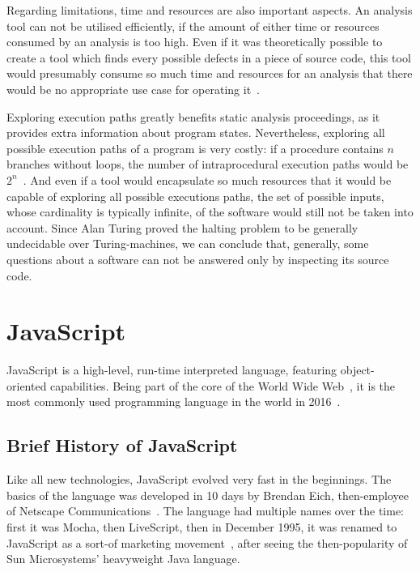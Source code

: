 Regarding limitations, time and resources are also important aspects. An analysis tool can not be utilised efficiently, if the amount of either time or resources consumed by an analysis is too high. Even if it was theoretically possible to create a tool which finds every possible defects in a piece of source code, this tool would presumably consume so much time and resources for an analysis that there would be no appropriate use case for operating it~\cite{anderson2008use}.

Exploring execution paths greatly benefits static analysis proceedings, as it provides extra information about program states. Nevertheless, exploring all possible execution paths of a program is very costly: if a procedure contains $n$ branches without loops, the number of intraprocedural execution paths would be $2^n$~\cite{anderson2008use}. And even if a tool would encapsulate so much resources that it would be capable of exploring all possible executions paths, the set of possible inputs, whose cardinality is typically infinite, of the software would still not be taken into account. Since Alan Turing proved the halting problem to be generally undecidable over Turing-machines, we can conclude that, generally, some questions about a software can not be answered only by inspecting its source code.


\section{JavaScript}

JavaScript is a high-level, run-time interpreted language, featuring object-oriented capabilities. Being part of the core of the World Wide Web~\cite{flanagan2006javascript}, it is the most commonly used programming language in the world in 2016~\cite{javascriptstackoverflow}.


\subsection{Brief History of JavaScript}

Like all new technologies, JavaScript evolved very fast in the beginnings. The basics of the language was developed in 10 days by Brendan Eich, then-employee of Netscape Communications~\cite{10.1109/MC.2012.57}. The language had multiple names over the time: first it was Mocha, then LiveScript, then in December 1995, it was renamed to JavaScript as a sort-of marketing movement~\cite{webedjavascripthistory}, after seeing the then-popularity of Sun Microsystems' heavyweight Java language.

